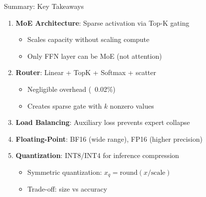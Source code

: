 \documentclass[aspectratio=169,10pt]{beamer}
\begin{document}
\begin{frame}{Summary: Key Takeaways}
    \begin{enumerate}
        \item \textbf{MoE Architecture}: Sparse activation via Top-K gating
        \begin{itemize}
            \item Scales capacity without scaling compute
            \item Only FFN layer can be MoE (not attention)
        \end{itemize}

        \item \textbf{Router}: Linear + TopK + Softmax + scatter
        \begin{itemize}
            \item Negligible overhead (~0.02\%)
            \item Creates sparse gate with $k$ nonzero values
        \end{itemize}

        \item \textbf{Load Balancing}: Auxiliary loss prevents expert collapse

        \item \textbf{Floating-Point}: BF16 (wide range), FP16 (higher precision)

        \item \textbf{Quantization}: INT8/INT4 for inference compression
        \begin{itemize}
            \item Symmetric quantization: $x_q = \text{round}(x / \text{scale})$
            \item Trade-off: size vs accuracy
        \end{itemize}
    \end{enumerate}
\end{frame}
\end{document}
